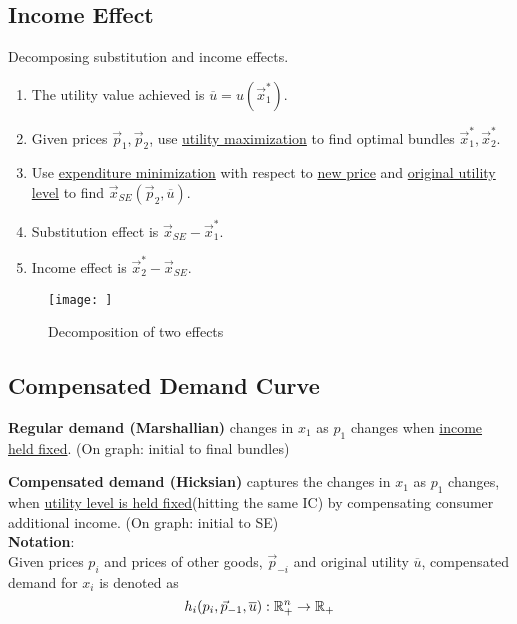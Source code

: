 \documentclass[]{article}
\begin{document}
        \subsection{Income Effect}
            \begin{remark} Decomposing substitution and income effects.
                \begin{enumerate}
                    \item The utility value achieved is $\overline{u} = u(\vec{x}^*_1)$.
                    \item Given prices $\vec{p}_1, \vec{p}_2$, use \ul{utility maximization} to find optimal bundles $\vec{x}^*_1, \vec{x}^*_2$.
                    \item Use \ul{expenditure minimization} with respect to \ul{new price} and \ul{original utility level} to find $\vec{x}_{SE}(\vec{p}_2, \overline{u})$.
                    \item Substitution effect is $\vec{x}_{SE} - \vec{x}^*_1$.
                    \item Income effect is $\vec{x}^*_2 - \vec{x}_{SE}$.
                \end{enumerate}
            \end{remark}
            \begin{figure}
                \centering
                \texttt{[image: ]}
                \caption{Decomposition of two effects}
                \label{fig:my_label}
            \end{figure}
        
        \subsection{Compensated Demand Curve}
            \begin{remark}
                \textbf{Regular demand (Marshallian)} changes in $x_1$ as $p_1$ changes when \ul{income held fixed}. (On graph: initial to final bundles)
            \end{remark}
            
            \begin{definition}
                \textbf{Compensated demand (Hicksian)} captures the changes in $x_1$ as $p_1$ changes, when \ul{utility level is held fixed}(hitting the same IC) by compensating consumer additional income. (On graph: initial to SE)
                \\\textbf{Notation}:
                \\Given prices $p_i$ and prices of other goods, $\vec{p}_{-i}$ and original utility $\overline{u}$, compensated demand for $x_i$ is denoted as
                \[
                    h_i(p_i, \vec{p}_{-1}, \overline{u}): \mathbb{R}^n_+ \rightarrow \mathbb{R}_+
                \]
            \end{definition}
\end{document}
